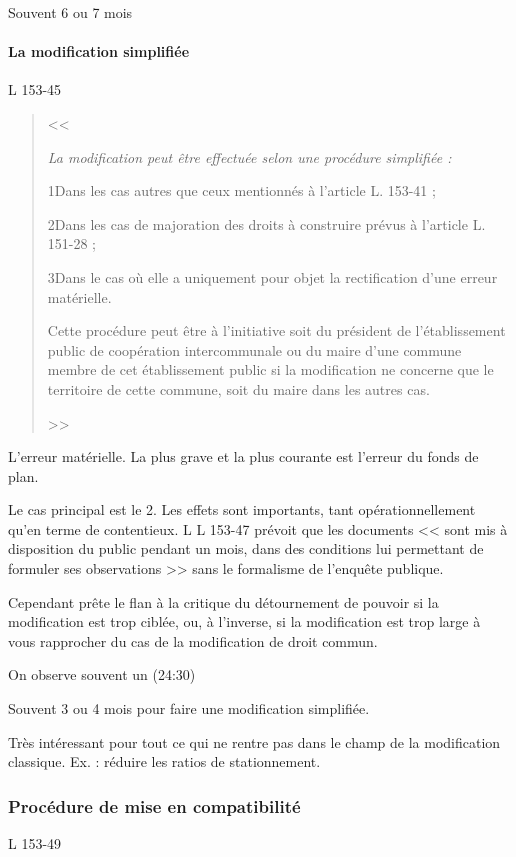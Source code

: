 	 		Souvent 6 ou 7 mois
	 		
	 		\paragraph{La modification simplifiée} L 153-45
		 		
		 		\begin{quote}
		 			<< {\itshape
		 				La modification peut être effectuée selon une procédure simplifiée :
		 				
		 				1\degres Dans les cas autres que ceux mentionnés à l'article L. 153-41 ;
		 				
		 				2\degres Dans les cas de majoration des droits à construire prévus à l'article L. 151-28 ;
		 				
		 				3\degres Dans le cas où elle a uniquement pour objet la rectification d'une erreur matérielle.
		 				
		 				Cette procédure peut être à l'initiative soit du président de l'établissement public de coopération intercommunale ou du maire d'une commune membre de cet établissement public si la modification ne concerne que le territoire de cette commune, soit du maire dans les autres cas.
		 			} >>
		 		\end{quote}
		 	
			 	L'erreur matérielle. La plus grave et la plus courante est l'erreur du fonds de plan.
			 	
			 	Le cas principal est le 2\ieme{}. Les effets sont importants, tant opérationnellement qu'en terme de contentieux. L  L 153-47 prévoit que les documents << sont mis à disposition du public pendant un mois, dans des conditions lui permettant de formuler ses observations >> sans le formalisme de l'enquête publique. 
			 	
			 	Cependant prête le flan à la critique du détournement de pouvoir si la modification est trop ciblée, ou, à l'inverse, si la modification est trop large à vous rapprocher du cas de la modification de droit commun.
			 	
			 	On observe souvent un (24:30)
			 	
			 	Souvent 3 ou 4 mois pour faire une modification simplifiée.
			 	
			 	Très intéressant pour tout ce qui ne rentre pas dans le champ de la modification classique. Ex. : réduire les ratios de stationnement. 
		 	
		 	\subsubsection{Procédure de mise en compatibilité} L 153-49
		 	
